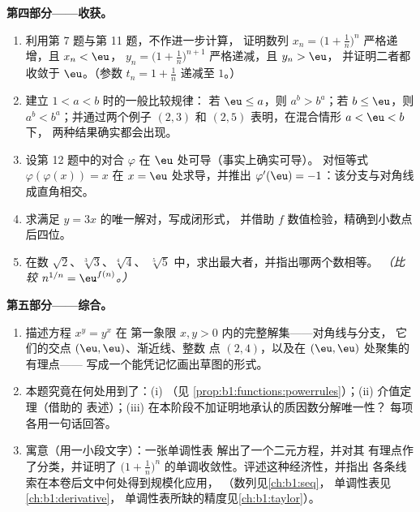 \begin{problem}
\medskip
\noindent\textbf{第四部分——收获。}
\begin{enumerate}[resume]
  \item 利用第 7 题与第 11 题，不作进一步计算，
        证明数列 $x_n = \bigl(1 +
        \frac1n\bigr)^n$ 严格递增，且 $x_n < \eu$，
        $y_n = \bigl(1 + \frac1n\bigr)^{n+1}$ 严格递减，且 $y_n > \eu$，
        并证明二者都收敛于
        $\eu$。（参数 $t_n = 1 + \frac1n$ 递减至
        $1$。）
  \item 建立 $1 < a < b$ 时的一般比较规律：
        若 $\eu \leq a$，则 $a^b > b^a$；若 $b \leq \eu$，则
        $a^b < b^a$；并通过两个例子 $(2, 3)$ 和
        $(2, 5)$ 表明，在混合情形 $a < \eu < b$ 下，
        两种结果确实都会出现。
  \item 设第 12 题中的对合 $\varphi$
        在 $\eu$ 处可导（事实上确实可导）。
        对恒等式 $\varphi(\varphi(x)) = x$ 在 $x = \eu$ 处求导，并推出
        $\varphi'(\eu) = -1$：该分支与对角线
        成直角相交。
  \item 求满足 $y = 3x$ 的唯一解对，写成闭形式，
        并借助 $f$ 数值检验，精确到小数点后四位。
  \item 在数 $\sqrt2$、$\sqrt[3]3$、$\sqrt[4]4$、
        $\sqrt[5]5$ 中，求出最大者，并指出哪两个数相等。
        \emph{（比较 $n^{1/n} =
        \eu^{f(n)}$。）}
\end{enumerate}

\medskip
\noindent\textbf{第五部分——综合。}
\begin{enumerate}[resume]
  \item 描述方程 $x^y = y^x$ 在
        第一象限 $x, y > 0$ 内的完整解集——对角线与分支，
        它们的交点 $(\eu, \eu)$、渐近线、整数
        点 $(2, 4)$，以及在 $(\eu, \eu)$ 处聚集的有理点——
        写成一个能凭记忆画出草图的形式。
  \item 本题究竟在何处用到了：(i) （见
        \cref{prop:b1:functions:powerrules}）；(ii)
        介值定理（借助的
        表述）；(iii) 在本阶段不加证明地承认的质因数分解唯一性？
        每项各用一句话回答。
  \item 寓意（用一小段文字）：一张单调性表
        解出了一个二元方程，并对其
        有理点作了分类，并证明了
        $\bigl(1 + \frac1n\bigr)^n$ 的单调收敛性。评述这种经济性，并指出
        各条线索在本卷后文中何处得到规模化应用，
        （数列见\cref{ch:b1:seq}，
        单调性表见\cref{ch:b1:derivative}，
        单调性表所缺的精度见\cref{ch:b1:taylor}）。
\end{enumerate}
\end{problem}
